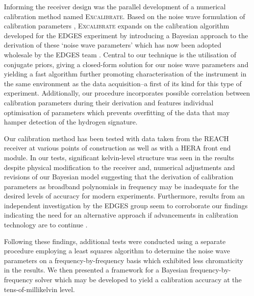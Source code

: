 Informing the receiver design was the parallel development of a numerical calibration method named \textsc{Excalibrate}. Based on the noise wave formulation of calibration parameters \citep{meys}, \textsc{Excalibrate} expands on the calibration algorithm developed for the EDGES experiment \citep{edgesCal} by introducing a Bayesian approach to the derivation of these ‘noise wave parameters’ which has now been adopted wholesale by the EDGES team \citep{murray_calpap}. Central to our technique is the utilisation of conjugate priors, giving a closed-form solution for our noise wave parameters and yielding a fast algorithm further promoting characterisation of the instrument in the same environment as the data acquisition--a first of its kind for this type of experiment. Additionally, our procedure incorporates possible correlation between calibration parameters during their derivation and features individual optimisation of parameters which prevents overfitting of the data that may hamper detection of the hydrogen signature.

Our calibration method has been tested with data taken from the REACH receiver at various points of construction as well as with a HERA front end module. In our tests, significant kelvin-level structure was seen in the results despite physical modification to the receiver and, numerical adjustments and revisions of our Bayesian model suggesting that the derivation of calibration parameters as broadband polynomials in frequency may be inadequate for the desired levels of accuracy for modern experiments. Furthermore, results from an independent investigation by the EDGES group seem to corroborate our findings indicating the need for an alternative approach if advancements in calibration technology are to continue \citep{murray_calpap}.

Following these findings, additional tests were conducted using a separate procedure employing a least squares algorithm to determine the noise wave parameters on a frequency-by-frequency basis which exhibited less chromaticity in the results. We then presented a framework for a Bayesian frequency-by-frequency solver which may be developed to yield a calibration accuracy at the tens-of-millikelvin level.


